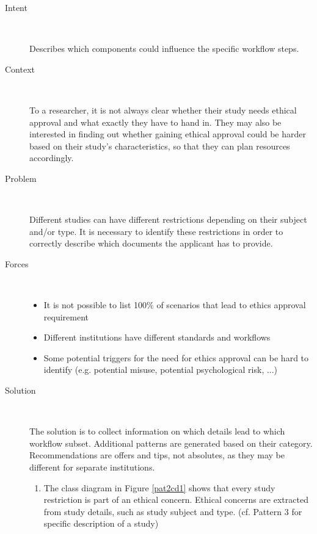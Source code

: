 \documentclass[10pt]{article}
\begin{document}
\begin{description}
	\item[Intent]~\par
		Describes which components could influence the specific workflow steps.

	\item[Context]~\par
		To a researcher, it is not always clear whether their study needs ethical approval and what exactly they have to hand in. They may also be interested in finding out whether gaining ethical approval could be harder based on their study's characteristics, so that they can plan resources accordingly.

	\item[Problem]~\par
		Different studies can have different restrictions depending on their subject and/or type. It is necessary to identify these restrictions in order to correctly describe which documents the applicant has to provide.

	\item[Forces]~\par
	\begin{itemize}
		\item It is not possible to list 100\% of scenarios that lead to ethics approval requirement
		\item Different institutions have different standards and workflows
		\item Some potential triggers for the need for ethics approval can be hard to identify (e.g. potential misuse, potential psychological risk, ...)


	\end{itemize}

	\item[Solution]~\par
		The solution is to collect information on which details lead to which workflow subset.  Additional patterns are generated based on their category. Recommendations are offers and tips, not absolutes, as they may be different for separate institutions.
	\begin{enumerate}
		\item The class diagram in Figure \ref{pat2cd1} shows that every study restriction is part of an ethical concern. Ethical concerns are extracted from study details, such as study subject and type. (cf. Pattern 3 for specific description of a study)\\
		

\end{enumerate}
\end{description}
\end{document}
